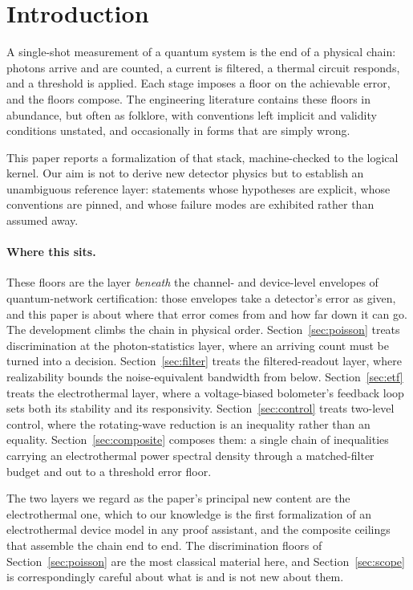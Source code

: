 \documentclass[aps,prx,reprint,nofootinbib,superscriptaddress]{revtex4-2}
\begin{document}
\section{Introduction}
\label{sec:intro}

A single-shot measurement of a quantum system is the end of a physical chain: photons arrive and are
counted, a current is filtered, a thermal circuit responds, and a threshold is applied. Each stage
imposes a floor on the achievable error, and the floors compose. The engineering literature contains
these floors in abundance, but often as folklore, with conventions left implicit and validity
conditions unstated, and occasionally in forms that are simply wrong.

This paper reports a formalization of that stack, machine-checked to the logical kernel. Our aim is
not to derive new detector physics but to establish an unambiguous reference layer: statements whose
hypotheses are explicit, whose conventions are pinned, and whose failure modes are exhibited rather
than assumed away.

\paragraph{Where this sits.} These floors are the layer \emph{beneath} the channel- and
device-level envelopes of quantum-network certification: those envelopes take a detector's error as
given, and this paper is about where that error comes from and how far down it can go. The
development climbs the chain in physical order. Section~\ref{sec:poisson} treats discrimination at
the photon-statistics layer, where an arriving count must be turned into a decision.
Section~\ref{sec:filter} treats the filtered-readout layer, where realizability bounds the
noise-equivalent bandwidth from below. Section~\ref{sec:etf} treats the electrothermal layer, where
a voltage-biased bolometer's feedback loop sets both its stability and its responsivity.
Section~\ref{sec:control} treats two-level control, where the rotating-wave reduction is an
inequality rather than an equality. Section~\ref{sec:composite} composes them: a single chain of
inequalities carrying an electrothermal power spectral density through a matched-filter budget and
out to a threshold error floor.

The two layers we regard as the paper's principal new content are the electrothermal one, which to
our knowledge is the first formalization of an electrothermal device model in any proof assistant,
and the composite ceilings that assemble the chain end to end. The discrimination floors of
Section~\ref{sec:poisson} are the most classical material here, and Section~\ref{sec:scope} is
correspondingly careful about what is and is not new about them.
\end{document}
